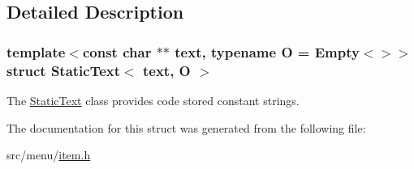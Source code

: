 \subsection{Detailed Description}
\subsubsection*{template$<$const char $\ast$$\ast$ text, typename O = Empty$<$$>$$>$\newline
struct Static\+Text$<$ text, O $>$}

The \hyperlink{structStaticText}{Static\+Text} class provides code stored constant strings. 

The documentation for this struct was generated from the following file\+:\begin{DoxyCompactItemize}
\item 
src/menu/\hyperlink{item_8h}{item.\+h}\end{DoxyCompactItemize}
